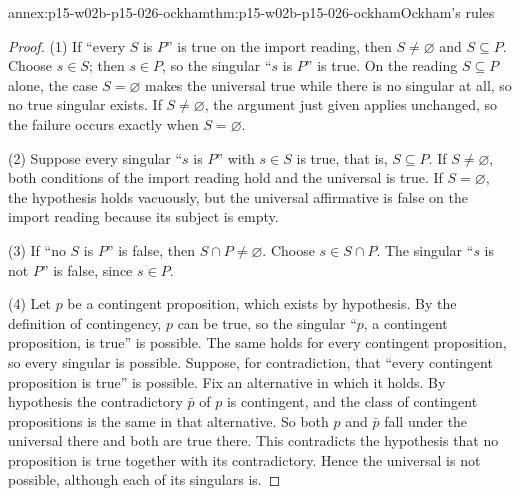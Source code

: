 \begin{annexitem}{annex:p15-w02b-p15-026-ockham}{thm:p15-w02b-p15-026-ockham}{Ockham's rules}
\begin{proof}
(1) If ``every $S$ is $P$'' is true on the import reading, then
$S\neq\varnothing$ and $S\subseteq P$. Choose $s\in S$; then $s\in P$, so
the singular ``$s$ is $P$'' is true. On the reading $S\subseteq P$ alone,
the case $S=\varnothing$ makes the universal true while there is no
singular at all, so no true singular exists. If $S\neq\varnothing$, the
argument just given applies unchanged, so the failure occurs exactly when
$S=\varnothing$.

(2) Suppose every singular ``$s$ is $P$'' with $s\in S$ is true, that is,
$S\subseteq P$. If $S\neq\varnothing$, both conditions of the import
reading hold and the universal is true. If $S=\varnothing$, the hypothesis
holds vacuously, but the universal affirmative is false on the import
reading because its subject is empty.

(3) If ``no $S$ is $P$'' is false, then $S\cap P\neq\varnothing$. Choose
$s\in S\cap P$. The singular ``$s$ is not $P$'' is false, since $s\in P$.

(4) Let $p$ be a contingent proposition, which exists by hypothesis. By
the definition of contingency, $p$ can be true, so the singular ``$p$, a
contingent proposition, is true'' is possible. The same holds for every
contingent proposition, so every singular is possible. Suppose, for
contradiction, that ``every contingent proposition is true'' is possible.
Fix an alternative in which it holds. By hypothesis the contradictory
$\bar p$ of $p$ is contingent, and the class of contingent propositions is
the same in that alternative. So both $p$ and $\bar p$ fall under the
universal there and both are true there. This contradicts the hypothesis
that no proposition is true together with its contradictory. Hence the
universal is not possible, although each of its singulars is.
\end{proof}
\end{annexitem}

